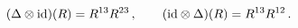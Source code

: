 \begin{equation}\label{boro2.5}
(\Delta\otimes {\rm id})(R)=R^{13}R^{23}\,,\qquad
({\rm id}\otimes\Delta)(R)=R^{13}R^{12}\,.
\end{equation}

